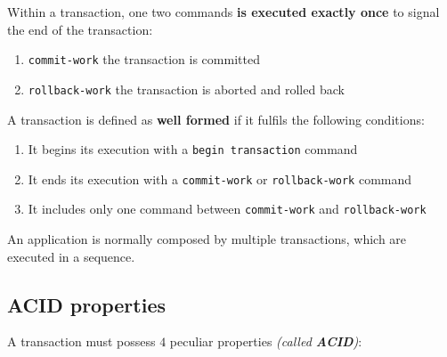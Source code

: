 \documentclass[english]{article}
\begin{document}
Within a transaction, one two commands \textbf{is executed exactly once} to signal the end of the transaction:

\begin{enumerate}
  \item \texttt{commit-work} the transaction is committed
  \item \texttt{rollback-work} the transaction is aborted and rolled back
\end{enumerate}

A transaction is defined as \textbf{well formed} if it fulfils the following conditions:

\begin{enumerate}
  \item It begins its execution with a \texttt{begin transaction} command
  \item It ends its execution with a \texttt{commit-work} or \texttt{rollback-work} command
  \item It includes only one command between \texttt{commit-work} and \texttt{rollback-work}
\end{enumerate}

An application is normally composed by multiple transactions, which are executed in a sequence.

\subsection{ACID properties}

A transaction must possess \(4\) peculiar properties \textit{(called \textbf{ACID})}:
\end{document}
